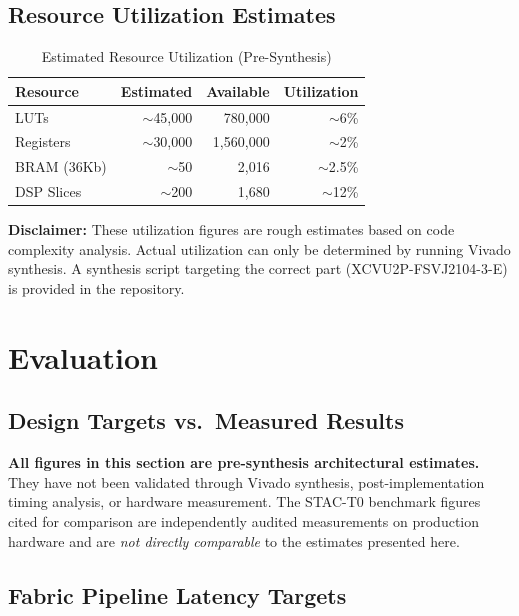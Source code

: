 \documentclass[conference,10pt]{IEEEtran}
\begin{document}
\subsection{Resource Utilization Estimates}

\begin{table}[h]
\centering
\caption{Estimated Resource Utilization (Pre-Synthesis)}
\label{tab:utilization}
\begin{tabular}{@{}lrrr@{}}
\toprule
Resource & Estimated & Available & Utilization \\
\midrule
LUTs & $\sim$45,000 & 780,000 & $\sim$6\% \\
Registers & $\sim$30,000 & 1,560,000 & $\sim$2\% \\
BRAM (36Kb) & $\sim$50 & 2,016 & $\sim$2.5\% \\
DSP Slices & $\sim$200 & 1,680 & $\sim$12\% \\
\bottomrule
\end{tabular}
\end{table}

\noindent\textbf{Disclaimer:} These utilization figures are rough estimates based on code complexity analysis. Actual utilization can only be determined by running Vivado synthesis. A synthesis script targeting the correct part (XCVU2P-FSVJ2104-3-E) is provided in the repository.

\section{Evaluation}
\label{sec:eval}

\subsection{Design Targets vs.\ Measured Results}

\textbf{All figures in this section are pre-synthesis architectural estimates.} They have not been validated through Vivado synthesis, post-implementation timing analysis, or hardware measurement. The STAC-T0 benchmark figures cited for comparison are independently audited measurements on production hardware and are \textit{not directly comparable} to the estimates presented here.

\subsection{Fabric Pipeline Latency Targets}
\end{document}
